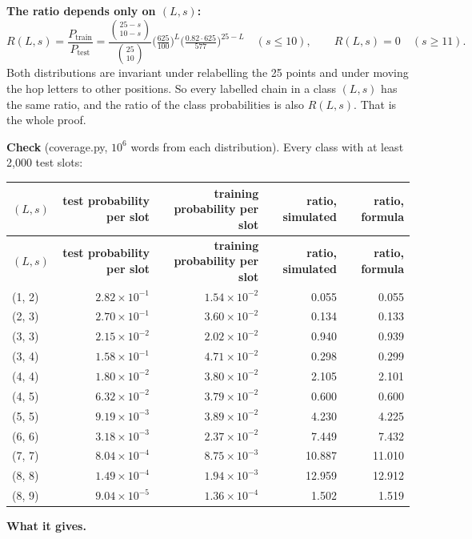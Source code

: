 \documentclass[paper=a4,fontsize=11pt,DIV=11,parskip=half,headings=small,numbers=noendperiod]{scrartcl}
\DeclareRobustCommand{\lead}[1]{\textsf{\bfseries\color{accent}#1}}
\DeclareRobustCommand{\code}[1]{{\fontseries{m}\ttfamily #1}}
\DeclareRobustCommand{\hdr}[1]{\textsf{\bfseries #1}}
\begin{document}
\lead{The ratio depends only on $(L,s)$:}
\[
R(L,s)=\frac{P_{\text{train}}}{P_{\text{test}}}=\frac{\binom{25-s}{10-s}}{\binom{25}{10}}\Big(\tfrac{625}{100}\Big)^{L}\Big(\tfrac{0.82\cdot625}{577}\Big)^{25-L}\quad(s\le10),\qquad
R(L,s)=0\quad(s\ge11). \]
Both distributions are invariant under relabelling the 25 points and under moving the hop letters to other
positions. So every labelled chain in a class $(L,s)$ has the same ratio, and the ratio of the class
probabilities is also $R(L,s)$. That is the whole proof.

\lead{Check} (\code{coverage.\allowbreak{}py}, $10^6$ words from each distribution). Every class with at least
2,000 test slots:

{\small\nopagebreak[4]
\begin{longtable}{@{}l r r r r@{}}
\toprule
\hdr{$(L,s)$} & \hdr{test probability per slot} & \hdr{training probability per slot} & \hdr{ratio, simulated} & \hdr{ratio, formula} \\
\midrule
\endfirsthead
\toprule
\hdr{$(L,s)$} & \hdr{test probability per slot} & \hdr{training probability per slot} & \hdr{ratio, simulated} & \hdr{ratio, formula} \\
\midrule
\endhead
\bottomrule
\endlastfoot
(1, 2) & $2.82\times10^{-1}$ & $1.54\times10^{-2}$ & 0.055 & 0.055 \\
(2, 3) & $2.70\times10^{-1}$ & $3.60\times10^{-2}$ & 0.134 & 0.133 \\
(3, 3) & $2.15\times10^{-2}$ & $2.02\times10^{-2}$ & 0.940 & 0.939 \\
(3, 4) & $1.58\times10^{-1}$ & $4.71\times10^{-2}$ & 0.298 & 0.299 \\
(4, 4) & $1.80\times10^{-2}$ & $3.80\times10^{-2}$ & 2.105 & 2.101 \\
(4, 5) & $6.32\times10^{-2}$ & $3.79\times10^{-2}$ & 0.600 & 0.600 \\
(5, 5) & $9.19\times10^{-3}$ & $3.89\times10^{-2}$ & 4.230 & 4.225 \\
(6, 6) & $3.18\times10^{-3}$ & $2.37\times10^{-2}$ & 7.449 & 7.432 \\
(7, 7) & $8.04\times10^{-4}$ & $8.75\times10^{-3}$ & 10.887 & 11.010 \\
(8, 8) & $1.49\times10^{-4}$ & $1.94\times10^{-3}$ & 12.959 & 12.912 \\
(8, 9) & $9.04\times10^{-5}$ & $1.36\times10^{-4}$ & 1.502 & 1.519 \\
\end{longtable}}

\lead{What it gives.}
\end{document}
